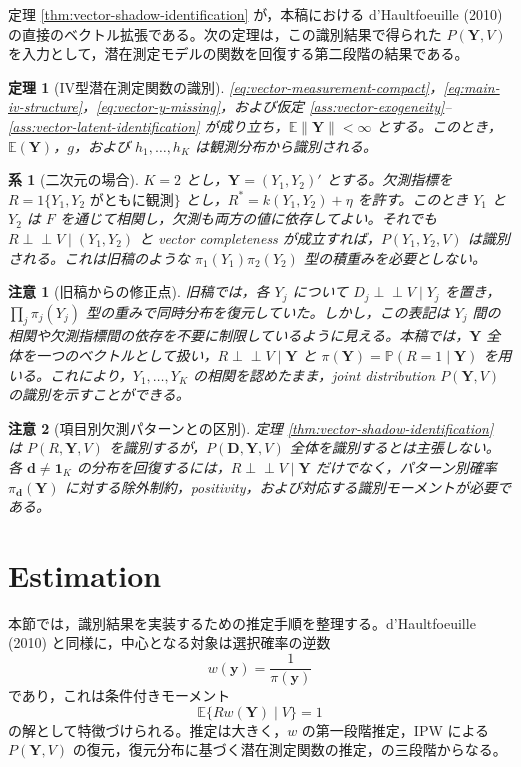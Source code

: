 \documentclass[10pt,a4paper]{article}
\newtheorem{theorem}{定理}
\newtheorem{corollary}{系}
\newtheorem{remark}{注意}
\newcommand{\indep}{\mathrel{\perp\!\!\!\perp}}
\newcommand{\E}{\mathbb{E}}
\newcommand{\Prb}{\mathbb{P}}
\newcommand{\1}{\mathbf{1}}
\newcommand{\Y}{\bm{Y}}
\newcommand{\D}{\bm{D}}
\begin{document}
定理 \ref{thm:vector-shadow-identification} が，本稿における d'Haultfoeuille (2010) の直接のベクトル拡張である。次の定理は，この識別結果で得られた $P(\Y,V)$ を入力として，潜在測定モデルの関数を回復する第二段階の結果である。

\begin{theorem}[IV型潜在測定関数の識別]
\label{thm:vector-iv-functions}
\eqref{eq:vector-measurement-compact}，\eqref{eq:main-iv-structure}，\eqref{eq:vector-y-missing}，および仮定 \ref{ass:vector-exogeneity}--\ref{ass:vector-latent-identification} が成り立ち，$\E\|\Y\|<\infty$ とする。このとき，$\E(\Y)$，$g$，および $h_1,\ldots,h_K$ は観測分布から識別される。
\end{theorem}

\begin{corollary}[二次元の場合]
\label{cor:two-dimensional}
$K=2$ とし，$\Y=(Y_1,Y_2)'$ とする。欠測指標を $R=1\{Y_1,Y_2\text{ がともに観測}\}$ とし，$R^*=k(Y_1,Y_2)+\eta$ を許す。このとき $Y_1$ と $Y_2$ は $F$ を通じて相関し，欠測も両方の値に依存してよい。それでも $R\indep V\mid (Y_1,Y_2)$ と vector completeness が成立すれば，$P(Y_1,Y_2,V)$ は識別される。これは旧稿のような $\pi_1(Y_1)\pi_2(Y_2)$ 型の積重みを必要としない。
\end{corollary}

\begin{remark}[旧稿からの修正点]
旧稿では，各 $Y_j$ について $D_j\indep V\mid Y_j$ を置き，$\prod_j\pi_j(Y_j)$ 型の重みで同時分布を復元していた。しかし，この表記は $Y_j$ 間の相関や欠測指標間の依存を不要に制限しているように見える。本稿では，$\Y$ 全体を一つのベクトルとして扱い，$R\indep V\mid \Y$ と $\pi(\Y)=\Prb(R=1\mid \Y)$ を用いる。これにより，$Y_1,\ldots,Y_K$ の相関を認めたまま，joint distribution $P(\Y,V)$ の識別を示すことができる。
\end{remark}

\begin{remark}[項目別欠測パターンとの区別]
定理 \ref{thm:vector-shadow-identification} は $P(R,\Y,V)$ を識別するが，$P(\D,\Y,V)$ 全体を識別するとは主張しない。各 $\bm d\ne\bm 1_K$ の分布を回復するには，$R\indep V\mid\Y$ だけでなく，パターン別確率 $\pi_{\bm d}(\Y)$ に対する除外制約，positivity，および対応する識別モーメントが必要である。
\end{remark}

\section{Estimation}

本節では，識別結果を実装するための推定手順を整理する。d'Haultfoeuille (2010) と同様に，中心となる対象は選択確率の逆数
\begin{equation}
  w(\bm y)=\frac{1}{\pi(\bm y)}
\end{equation}
であり，これは条件付きモーメント
\begin{equation}
  \E\{Rw(\Y)\mid V\}=1
  \label{eq:estimation-main-equation}
\end{equation}
の解として特徴づけられる。推定は大きく，$w$ の第一段階推定，IPW による $P(\Y,V)$ の復元，復元分布に基づく潜在測定関数の推定，の三段階からなる。
\end{document}
